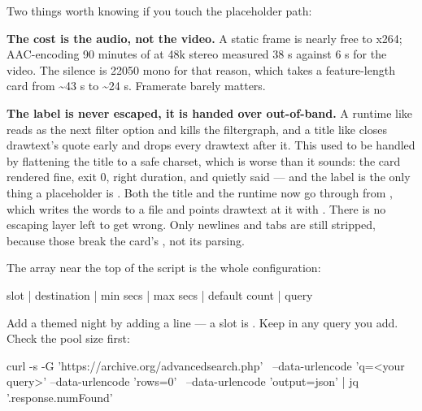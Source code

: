 \documentclass[fontpath=fonts/,logopath=logo/]{riposte-doc}
\begin{document}
Two things worth knowing if you touch the placeholder path:

\begin{ripbullets}
\item \textbf{The cost is the audio, not the video.} A static frame is nearly free to x264; AAC-encoding 90 minutes of  at 48k stereo measured 38 s against 6 s for the video. The silence is 22050 mono for that reason, which takes a feature-length card from \textasciitilde{}43 s to \textasciitilde{}24 s. Framerate barely matters.
\item \textbf{The label is never escaped, it is handed over out-of-band.} A runtime like  reads as the next filter option and kills the filtergraph, and a title like  closes drawtext's quote early and drops every drawtext after it. This used to be handled by flattening the title to a safe charset, which is worse than it sounds: the card rendered fine, exit 0, right duration, and quietly said  — and the label is the only thing a placeholder is . Both the title and the runtime now go through  from , which writes the words to a file and points drawtext at it with . There is no escaping layer left to get wrong. Only newlines and tabs are still stripped, because those break the card's , not its parsing.
\end{ripbullets}



The  array near the top of the script is the whole configuration:

\ripcodeopen
{}
\begin{ripcodeblock}
slot | destination | min secs | max secs | default count | query
\end{ripcodeblock}
\ripcodesizereset\ripcodeclose

Add a themed night by adding a line — a  slot is . Keep  in any query you add. Check the pool size first:

\ripcodeopen
{}
\begin{ripcodeblock}
curl -s -G 'https://archive.org/advancedsearch.php' \
  --data-urlencode 'q=<your query>' --data-urlencode 'rows=0' \
  --data-urlencode 'output=json' | jq '.response.numFound'
\end{ripcodeblock}
\ripcodesizereset\ripcodeclose

\ripdashrule


\ripend
\end{document}

